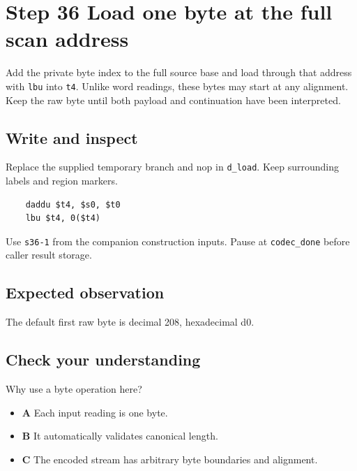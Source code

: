 \section{Step 36 Load one byte at the full scan address}\label{delta-s36}

Add the private byte index to the full source base and load through that address with \texttt{lbu} into \texttt{t4}. Unlike word readings, these bytes may start at any alignment. Keep the raw byte until both payload and continuation have been interpreted.

\subsection{Write and inspect}
Replace the supplied temporary branch and nop in \texttt{d\_load}. Keep surrounding labels and region markers.

\begin{verbatim}
    daddu $t4, $s0, $t0
    lbu $t4, 0($t4)
\end{verbatim}
Use \texttt{s36-1} from the companion construction inputs. Pause at \texttt{codec\_done} before caller result storage.

\subsection{Expected observation}
The default first raw byte is decimal 208, hexadecimal d0.

\subsection{Check your understanding}
Why use a byte operation here?

\begin{itemize}
  \item \textbf{A} Each input reading is one byte.
  \item \textbf{B} It automatically validates canonical length.
  \item \textbf{C} The encoded stream has arbitrary byte boundaries and alignment.
\end{itemize}
